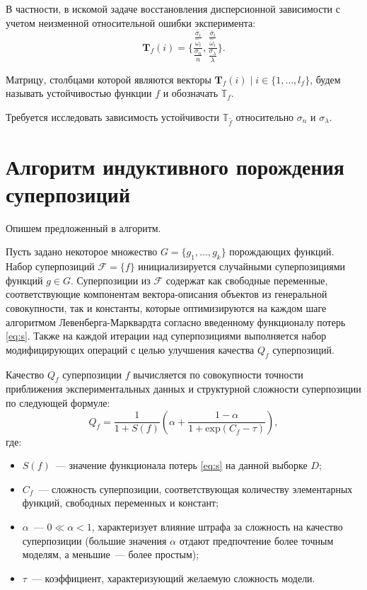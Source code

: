 \documentclass[11pt,a4paper]{article}
\theoremstyle{definition}
\begin{document}
В частности, в искомой задаче восстановления дисперсионной зависимости с учетом неизменной
относительной ошибки эксперимента:
\[
  \mathbf{T}_f(i) = \Big\{ \frac{\frac{\overline{\sigma}_i}{\hat{\omega}_i}}{\frac{\sigma_n}{n}}, \frac{\frac{\overline{\sigma}_i}{\hat{\omega}_i}}{\frac{\sigma_{\lambda}}{\lambda}} \Big\}.
\]

Матрицу, столбцами которой являются векторы $\mathbf{T}_f(i) \mid i \in \{ 1, \dots, l_f \}$,
будем называть устойчивостью функции $f$ и обозначать $\mathbb{T}_f$.

Требуется исследовать зависимость устойчивости $\mathbb{T}_{\hat{f}}$ относительно
$\sigma_n$ и $\sigma_{\lambda}$.

\section{Алгоритм индуктивного порождения суперпозиций}

Опишем предложенный в \cite{Rudoy13} алгоритм.

Пусть задано некоторое множество $G = \{ g_1, \dots, g_k \}$ 
порождающих функций. Набор суперпозиций $\mathcal{F} = \{ f \}$
инициализируется случайными суперпозициями функций $g \in G$. Суперпозиции из
$\mathcal{F}$ содержат как свободные переменные, соответствующие
компонентам вектора-описания объектов из генеральной совокупности, так и
константы, которые оптимизируются на каждом шаге алгоритмом Левенберга-Марквардта
согласно введенному функционалу потерь \eqref{eq:s}. Также на каждой итерации
над суперпозициями выполняется набор модифицирующих операций с целью улучшения
качества $Q_f$ суперпозиций.

Качество $Q_f$ суперпозиции $f$ вычисляется по совокупности точности приближения
экспериментальных данных и структурной сложности суперпозиции по следующей формуле:
\begin{equation}
  Q_f = \frac{1}{1 + S(f)} \left(\alpha + \frac{1 - \alpha}{1 + \text{exp} (C_f - \tau)}\right),
  \label{eq:s_f}
\end{equation}
где:
\begin{itemize}
  \item[] $S(f)$~--- значение функционала потерь \eqref{eq:s} на данной выборке $D$;
  \item[] $C_f$~--- сложность суперпозиции, соответствующая количеству элементарных
	функций, свободных переменных и констант;
  \item[] $\alpha$~--- $0 \ll \alpha < 1$, характеризует влияние штрафа за сложность
	на качество суперпозиции (большие значения $\alpha$ отдают предпочтение более
	точным моделям, а меньшие~--- более простым);
  \item[] $\tau$~--- коэффициент, характеризующий желаемую сложность модели.
\end{itemize}
\end{document}
